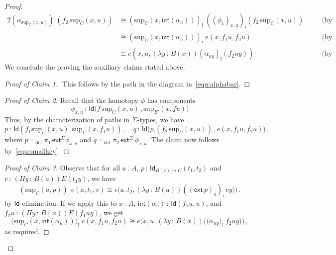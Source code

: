 \documentclass[10pt,a4paper,oneside,reqno]{amsart}
\numberwithin{equation}{section}
\def\noqed{\renewcommand{\qedsymbol}{}}
\theoremstyle{mythm}
\theoremstyle{mydef}
\theoremstyle{myrmk}
\newcommand{\defeq}{=_{\mathrm{def}}}
\newcommand{\co}{\,{:}\,}
\newcommand{\iso}{\cong}
\newcommand{\ext}{\mathsf{ext}}
\renewcommand{\int}{\mathsf{int}}
\newcommand{\Id}{\mathsf{Id}}
\renewcommand{\sup}{\mathrm{sup}}
\begin{document}
\begin{proof}
 \begin{alignat*}{2} 
 (\alpha_{\sup_C(x,u)})_{!} ( f_2 \, \sup_C(x,u) ) 
 &  \iso  
 (\sup_C(x, \int(\alpha_u)))_{!} \;  ((\phi_1)_{x,u})_{!}  (f_2 \, \sup_C(x,u) )  
 & \quad &  \text{(by Claim 1)} \\ 
& \iso  
 (\sup_C(x, \int(\alpha_u)))_{!} \;   e(x, f_1 u, f_2 u)  
 & \quad &  \text{(by Claim 2)} \\
&  \iso e(x, u, (\lambda y \co B(x)) (\alpha_{uy})_{!}( f_2 u y))  
     & \quad  & \text{(by Claim 3).} 
  \end{alignat*} 
We conclude the proving the auxiliary claims stated above.

\begin{proof}[Proof of Claim 1.]  This follows by the path in the diagram in~\eqref{equ:alphabar}. \noqed
\end{proof}  



\begin{proof}[Proof of Claim 2] Recall that the homotopy $\phi$ has components 
 \[
\phi_{x,u} \co \Id \big( f  \,  \sup_C(x,u) \, ,  \sup_{E'}(x, fu) \big)
\]
Thus, by the characterization of paths in $\Sigma$-types, we have
\[
p  \co \Id( f_1 \sup_C(x,u) , \sup_C(x, f_1 u)) \, , \quad
q \co  
\Id\big( p_{!} ( f_2 \, \sup_C(x,u))    \, ,     e(x, f_1 u, f_2 u) \big) \, ,
 \]   
 where $p \defeq \pi_1 \, \ext^\Sigma \phi_{x,u}$ and $q \defeq \pi_2 \, \ext^\Sigma \, \phi_{x,u}$. 
 The claim now follows by~\eqref{equ:smallkey}. 
 \noqed
\end{proof}

\vspace{-1ex}
 
 \begin{proof}[Proof of Claim 3] 
Observe that for all $a \co A$, $p \co \Id_{B(a) \to C}(t_1, t_2)$  and 
$v \co (\Pi y \co B(a))E(t_1y)$, we have
\[ 
(\sup_C(a,p))_{!}\, e(a,t_1,v)  \iso 
e \big( a, t_2,  (\lambda y \co B(a)) ( (\ext \, p)_y )_{!}\, v y \big) \big)   \, . 
\]
by $\Id$-elimination. If we apply this to $x \co A$, $\int(\alpha_u) \co \Id( f_1 u, u)$, and $f_2 u \co
(\Pi y \co B(x)) E(f_1 u y)$, we get
\[
\big( \sup_C(x,\int(\alpha_u)) \big)_{!} \; e(x, f_1 u , f_2 u) \iso 
e\big(x, u , (\lambda y \co B(x)) \big( (\alpha_{u y} \big)_{!} \;  f_2 u y  \big) \big) 
 \, ,
\]
as required.   \end{proof}  \noqed
\end{proof}

\vspace{-0.8cm}
\end{document}
